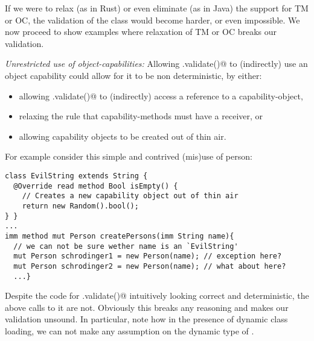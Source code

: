 
\noindent If we were to relax (as in Rust) or even eliminate (as in Java) the support for TM or OC, the validation of the \Q@Person@ class would become harder, or even impossible. We now proceed to show examples where
relaxation of TM or OC breaks our validation. 

\loseSpace
\noindent\textit{Unrestricted use of object-capabilities:}
Allowing \Q@.validate()@ to (indirectly) use an object capability could allow for it to be non deterministic, by either:
\begin{itemize}
\item allowing \Q@.validate()@ to (indirectly) access a \Q@mut@ reference to a capability-object,
\item relaxing the rule that capability-methods must have a \Q@mut@ receiver, or
\item allowing capability objects to be created out of thin air.
\end{itemize}

\noindent For example consider this simple and contrived (mis)use of person:
\begin{lstlisting}
class EvilString extends String {
  @Override read method Bool isEmpty() {
    // Creates a new capability object out of thin air
    return new Random().bool();
} }
...
imm method mut Person createPersons(imm String name){
  // we can not be sure wether name is an `EvilString'
  mut Person schrodinger1 = new Person(name); // exception here?
  mut Person schrodinger2 = new Person(name); // what about here?
  ...}
\end{lstlisting}
Despite the code for \Q@Person.validate()@ intuitively looking correct and deterministic, the above calls to it are not. Obviously this breaks any reasoning and makes our validation unsound. 
In particular, note how in the presence of dynamic class loading, 
we can not make any assumption on the dynamic type of \Q@name@.

